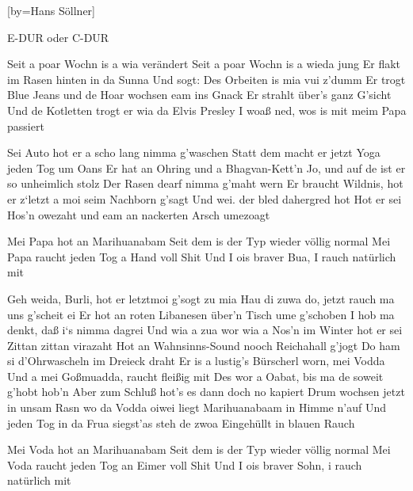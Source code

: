 
[by={Hans Söllner}]

\chordsoff

\beginverse
\nolyrics E-DUR oder C-DUR
\endverse

\beginverse
Seit a poar Wochn is a wia verändert 
Seit a poar Wochn is a wieda jung 
Er flakt im Rasen hinten in da Sunna 
Und sogt: Des Orbeiten is mia vui z'dumm 
Er trogt Blue Jeans und de Hoar wochsen eam ins Gnack 
Er strahlt über's ganz G'sicht 
Und de Kotletten trogt er wia da Elvis Presley 
I woaß ned, wos is mit meim Papa passiert 
\endverse

\beginverse
Sei Auto hot er a scho lang nimma g'waschen 
Statt dem macht er jetzt Yoga jeden Tog um Oans 
Er hat an Ohring und a Bhagvan-Kett'n 
Jo, und auf de ist er so unheimlich stolz 
Der Rasen dearf nimma g'maht wern 
Er braucht Wildnis, hot er z`letzt a moi seim Nachborn g'sagt 
Und wei. der bled dahergred hot 
Hot er sei Hos'n owezaht und eam an nackerten Arsch umezoagt 
\endverse

\beginchorus
Mei Papa hot an Marihuanabam 
Seit dem is der Typ wieder völlig normal 
Mei Papa raucht jeden Tog a Hand voll Shit 
Und I ois braver Bua, I rauch natürlich mit 
\endchorus

\beginverse
Geh weida, Burli, hot er letztmoi g'sogt zu mia 
Hau di zuwa do, jetzt rauch ma uns g'scheit ei 
Er hot an roten Libanesen über'n Tisch ume g'schoben 
I hob ma denkt, daß i`s nimma dagrei 
Und wia a zua wor wia a Nos'n im Winter hot er sei Zittan zittan virazaht 
Hot an Wahnsinns-Sound nooch Reichahall g'jogt 
Do ham si d'Ohrwascheln im Dreieck draht 
\endverse
\beginverse
Er is a lustig's Bürscherl worn, mei Vodda 
Und a mei Goßmuadda, raucht fleißig mit 
Des wor a Oabat, bis ma de soweit g'hobt hob'n 
Aber zum Schluß hot's es dann doch no kapiert 
Drum wochsen jetzt in unsam Rasn wo da Vodda oiwei liegt 
Marihuanabaam in Himme n'auf 
Und jeden Tog in da Frua siegst'as steh de zwoa 
Eingehüllt in blauen Rauch 
\endverse

\beginchorus
Mei Voda hot an Marihuanabam 
Seit dem is der Typ wieder völlig normal 
Mei Voda raucht jeden Tog an Eimer voll Shit 
Und I ois braver Sohn, i rauch natürlich mit
\endchorus

\endsong